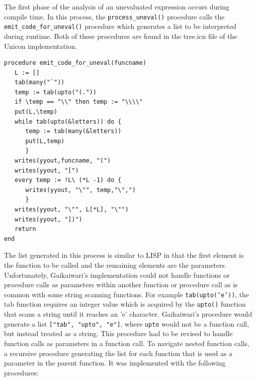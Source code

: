 \documentclass{article}
\begin{document}
The first phase of the analysis of an unevaluated expression occurs during compile time.  In this process, the \texttt{process\_uneval()} procedure calls the
\newline\texttt{emit\_code\_for\_uneval()} procedure which generates a list to be interpreted during runtime.  Both of these procedures are found in the tree.icn file of the Unicon implementation.\\
\begin{verbatim}
procedure emit_code_for_uneval(funcname)
   L := []
   tab(many("`"))
   temp := tab(upto("(.")) 
   if \temp == "\\" then temp := "\\\\"
   put(L,\temp)
   while tab(upto(&letters)) do {
      temp := tab(many(&letters))
      put(L,temp)
      }
   writes(yyout,funcname, "(")
   writes(yyout, "[")
   every temp := !L\ (*L -1) do {
      writes(yyout, "\"", temp,"\",")
      }
   writes(yyout, "\"", L[*L], "\"")
   writes(yyout, "])")
   return
end
\end{verbatim}
The list generated in this process is similar to LISP in that the first element is the function to be called and the remaining elements are the parameters.  Unfortunately, Gaikaiwari's implementation could not handle functions or procedure calls as parameters within another function or procedure call as is common with some string scanning functions.  For example \texttt{tab(upto('e'))}, the tab function requires an integer value which is acquired by the \texttt{upto()} function that scans a string until it reaches an 'e' character.  Gaikaiwari's procedure would generate a list \texttt{["tab", "upto", "e"]}, where \texttt{upto} would not be a function call, but instead treated as a string.  This procedure had to be revised to handle function calls as parameters in a function call.  To navigate nested function calls, a recursive procedure generating the list for each function that is used as a parameter in the parent function.  It was implemented with the following procedures: \\
\end{document}
